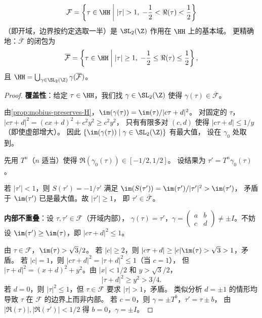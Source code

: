 \begin{theorem}[$\SL_2(\Z)$ 的标准基本域]
\label{thm:fundamental-domain}
\[
  \mathcal{F} = \left\{\tau \in \HH \;\middle|\;
    |\tau| > 1,\; -\frac{1}{2} < \Re(\tau) < \frac{1}{2}
  \right\}
\]
（即开域，边界按约定选取一半）是 $\SL_2(\Z)$ 作用在 $\HH$ 上的基本域。
更精确地：$\overline{\mathcal{F}}$ 的闭包为
\[
  \overline{\mathcal{F}} = \left\{\tau \in \HH \;\middle|\;
    |\tau| \geq 1,\; -\frac{1}{2} \leq \Re(\tau) \leq \frac{1}{2}
  \right\},
\]
且 $\HH = \bigcup_{\gamma \in \SL_2(\Z)} \gamma(\overline{\mathcal{F}})$。
\end{theorem}

\begin{proof}
\textbf{覆盖性}：给定 $\tau \in \HH$，我们找 $\gamma \in \SL_2(\Z)$
使得 $\gamma(\tau) \in \overline{\mathcal{F}}$。

由\cref{prop:mobius-preserves-H}，$\im(\gamma(\tau)) = \im(\tau)/|c\tau + d|^2$。
对固定的 $\tau$，$|c\tau + d|^2 = (cx + d)^2 + c^2 y^2 \geq c^2 y^2$，
只有有限多对 $(c,d)$ 使得 $|c\tau + d| \leq 1/y$（即使虚部增大）。
因此 $\{\im(\gamma(\tau)) \mid \gamma \in \SL_2(\Z)\}$ 有最大值，
设在 $\gamma_0$ 处取到。

先用 $T^n$（$n$ 适当）使得 $\Re(\gamma_0(\tau)) \in [-1/2, 1/2]$。
设结果为 $\tau' = T^n \gamma_0(\tau)$。

若 $|\tau'| < 1$，则 $S(\tau') = -1/\tau'$ 满足
$\im(S(\tau')) = \im(\tau')/|\tau'|^2 > \im(\tau')$，
矛盾于 $\im(\tau')$ 已是最大值。故 $|\tau'| \geq 1$，
即 $\tau' \in \overline{\mathcal{F}}$。

\textbf{内部不重叠}：设 $\tau, \tau' \in \mathcal{F}$（开域内部），
$\gamma(\tau) = \tau'$，$\gamma = \begin{pmatrix} a & b \\ c & d \end{pmatrix}
\neq \pm I$。不妨设 $\im(\tau') \geq \im(\tau)$，即
$|c\tau + d|^2 \leq 1$。

由 $\tau \in \mathcal{F}$，$\im(\tau) > \sqrt{3}/2$。
若 $|c| \geq 2$，则 $|c\tau + d| \geq |c|\im(\tau) > \sqrt{3} > 1$，矛盾。
若 $|c| = 1$，则 $|c\tau + d|^2 = |\tau + d|^2 \leq 1$（当 $c = 1$），
但 $|\tau + d|^2 = (x + d)^2 + y^2$。由 $|x| < 1/2$ 和 $y > \sqrt{3}/2$，
\[
  |\tau + d|^2 \geq y^2 > 3/4.
\]
若 $d = 0$，则 $|\tau|^2 \leq 1$，但 $\tau \in \mathcal{F}$ 要求
$|\tau| > 1$，矛盾。
类似分析 $d = \pm 1$ 的情形均导致 $\tau$ 在 $\mathcal{F}$ 的边界上而非内部。
若 $c = 0$，则 $\gamma = \pm T^b$，$\tau' = \tau \pm b$，
由 $|\Re(\tau)|, |\Re(\tau')| < 1/2$ 得 $b = 0$，$\gamma = \pm I$。
\end{proof}

